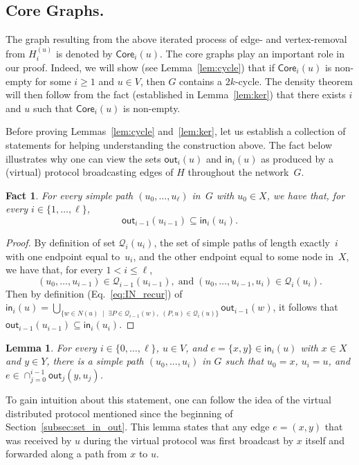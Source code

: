 \documentclass{article}
\newcommand{\F}{{\mathsf{out}}}
\renewcommand{\H}{{\mathsf{in}}}
\newcommand{\bp}{X}
\newcommand{\tp}{Y}
\newtheorem{lemma}{Lemma}
\newtheorem{fact}{Fact}
\begin{document}
\subsection{Core Graphs.} The graph resulting from the above iterated process of edge- and vertex-removal from $H_i^{(u)}$ is denoted by $\mathsf{Core}_i(u)$. 
The core graphs play an important role in our proof. Indeed, we will show (see Lemma~\ref{lem:cycle}) that if $\mathsf{Core}_i(u)$ is non-empty for some $i\geq 1$ and $u\in V$, then $G$ contains a $2k$-cycle. The density theorem will then follow from the fact (established in  Lemma~\ref{lem:ker}) that there exists $i$ and $u$ such that $\mathsf{Core}_i(u)$ is non-empty. 

\medbreak

Before proving Lemmas~\ref{lem:cycle} and~\ref{lem:ker}, let us establish a collection of statements for helping understanding the construction above. The fact below illustrates why one can view the sets $\F_i(u)$ and $\H_i(u)$ as produced by a (virtual)  protocol broadcasting edges of $H$ throughout the network~$G$. 

\begin{fact}\label{fact:OUT_to_IN}
    For every simple path $(u_0,\dots,u_\ell)$ in~$G$ with $u_0\in \bp$, we have that, for every $i\in\{1,\dots,\ell\}$, \[\F_{i-1}(u_{i-1})\subseteq\H_i(u_i).\]
\end{fact}

\begin{proof}
    By definition of set $\mathcal{Q}_i(u_i)$, the set of simple paths of length exactly~$i$ with one endpoint equal to~$u_i$, and the other endpoint equal to some node in~$\bp$, we have that, for every $1<i\leq \ell$,  \[(u_0,\dots,u_{i-1})\in\mathcal{Q}_{i-1}(u_{i-1}), \;\mbox{and}\; (u_0,\dots,u_{i-1},u_i)\in\mathcal{Q}_i(u_i).\]
    Then by definition (Eq.~\eqref{eq:IN_recur}) of $\H_i(u) = \bigcup\limits_{\{w\in N(u) \;\mid\; \exists P\in\mathcal{Q}_{i-1}(w),\; (P,u)\in\mathcal{Q}_i(u)\}} \F_{i-1}(w)$, it follows that $\F_{i-1}(u_{i-1})\subseteq\H_i(u_i)$.
\end{proof}

\begin{lemma}\label{lem:path_to_z}
    For every $i\in\{0,\dots,\ell\}$, $u\in V$, and $e=\{x,y\} \in \H_i(u)$ with $x\in \bp$ and $y\in \tp$, there is a simple path $(u_0,\dots,u_i)$ in $G$ such that $u_0=x$, $u_i=u$, and $e \in \cap_{j=0}^{i-1} \F_j(y,u_j)$.
\end{lemma}

To gain intuition about this statement, one can follow the idea of the virtual distributed protocol mentioned since the beginning of Section~\ref{subsec:set_in_out}. This lemma states that any edge $e=(x,y)$ that was received by $u$ during the virtual protocol was first broadcast by $x$ itself and forwarded along a path from $x$ to $u$.
\end{document}
